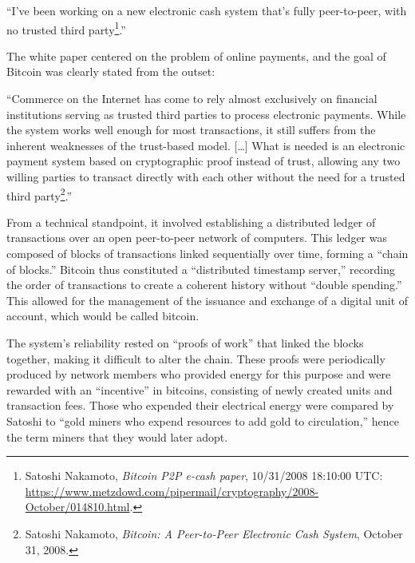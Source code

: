 \documentclass[
  a5paper,
  smalldemyvopaper,10pt,twoside,onecolumn,openright,extrafontsizes,hidelinks]{memoir}
\begin{document}
``I've been working on a new electronic cash system that's fully
peer-to-peer, with no trusted third party\footnote{Satoshi Nakamoto,
  \emph{Bitcoin P2P e-cash paper}, 10/31/2008 18:10:00 UTC:
  \url{https://www.metzdowd.com/pipermail/cryptography/2008-October/014810.html}.}.''

The white paper centered on the problem of online payments, and the goal
of Bitcoin was clearly stated from the outset:

``Commerce on the Internet has come to rely almost exclusively on
financial institutions serving as trusted third parties to process
electronic payments. While the system works well enough for most
transactions, it still suffers from the inherent weaknesses of the
trust-based model. {[}\ldots{]} What is needed is an electronic payment
system based on cryptographic proof instead of trust, allowing any two
willing parties to transact directly with each other without the need
for a trusted third party\footnote{Satoshi Nakamoto, \emph{Bitcoin: A
  Peer-to-Peer Electronic Cash System}, October 31, 2008.}.''

From a technical standpoint, it involved establishing a distributed
ledger of transactions over an open peer-to-peer network of computers.
This ledger was composed of blocks of transactions linked sequentially
over time, forming a ``chain of blocks.'' Bitcoin thus constituted a
``distributed timestamp server,'' recording the order of transactions to
create a coherent history without ``double spending.'' This allowed for
the management of the issuance and exchange of a digital unit of
account, which would be called bitcoin.

The system's reliability rested on ``proofs of work'' that linked the
blocks together, making it difficult to alter the chain. These proofs
were periodically produced by network members who provided energy for
this purpose and were rewarded with an ``incentive'' in bitcoins,
consisting of newly created units and transaction fees. Those who
expended their electrical energy were compared by Satoshi to ``gold
miners who expend resources to add gold to circulation,'' hence the term
miners that they would later adopt.
\end{document}

